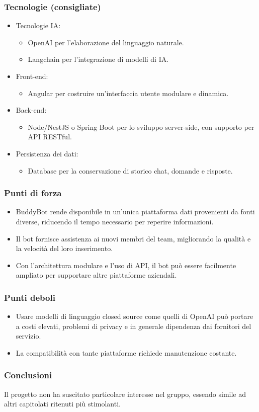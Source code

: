     \subsubsection{Tecnologie (consigliate)}
    \begin{itemize}
        \item Tecnologie IA:
        \begin{itemize}
            \item OpenAI per l'elaborazione del linguaggio naturale.
            \item Langchain per l’integrazione di modelli di IA.
        \end{itemize}
        \item Front-end:
        \begin{itemize}
            \item Angular per costruire un'interfaccia utente modulare e dinamica.
        \end{itemize}
        \item Back-end:
        \begin{itemize}
            \item Node/NestJS o Spring Boot per lo sviluppo server-side, con supporto per API RESTful.
        \end{itemize}
        \item Persistenza dei dati:
        \begin{itemize}
            \item Database per la conservazione di storico chat, domande e risposte.
        \end{itemize}
    \end{itemize}
    \subsubsection{Punti di forza}
    \begin{itemize}
        \item BuddyBot rende disponibile in un’unica piattaforma dati provenienti da fonti diverse, riducendo il tempo necessario per reperire informazioni.
        \item Il bot fornisce assistenza ai nuovi membri del team, migliorando la qualità e la velocità del loro inserimento.
        \item Con l’architettura modulare e l’uso di API, il bot può essere facilmente ampliato per supportare altre piattaforme aziendali.
    \end{itemize}
    \subsubsection{Punti deboli}
    \begin{itemize}
        \item Usare modelli di linguaggio closed source come quelli di OpenAI può portare a costi elevati, problemi di privacy e in generale dipendenza dai fornitori del servizio.
        \item La compatibilità con tante piattaforme richiede manutenzione costante.
    \end{itemize}
    \subsubsection{Conclusioni}
    Il progetto non ha suscitato particolare interesse nel gruppo, essendo simile ad altri capitolati ritenuti più stimolanti.



